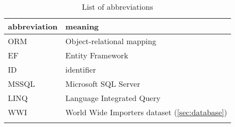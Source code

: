 
\begin{table}[h!]
    \centering

    \begin{tabular}{ll}
        \toprule
        abbreviation & meaning                        \\
        \midrule
        ORM     & Object-relational mapping           \\
        EF      & Entity Framework                    \\
        ID      & identifier                          \\
        MSSQL   & Microsoft SQL Server                \\
        LINQ    & Language Integrated Query           \\
        WWI     & World Wide Importers dataset (\autoref{sec:database})       \\
                &                                     \\
        \bottomrule
    \end{tabular}

    \caption{List of abbreviations}

\end{table}